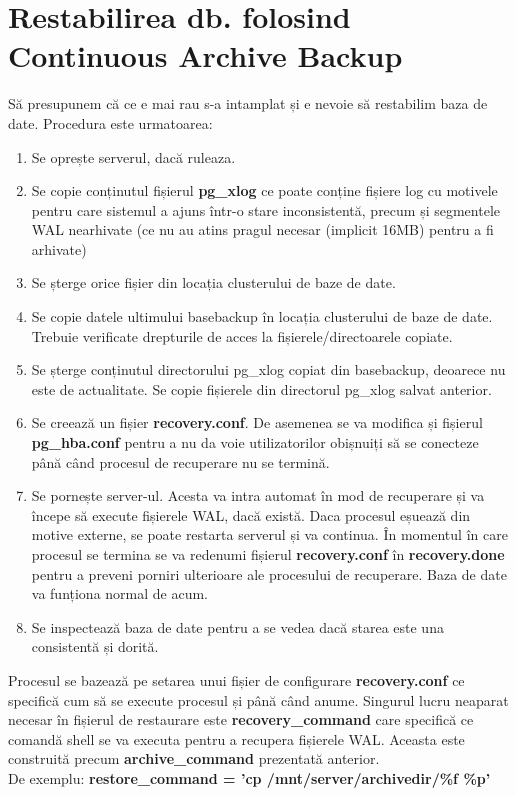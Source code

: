 \section{Restabilirea db. folosind Continuous Archive Backup}
Să presupunem că ce e mai rau s-a intamplat și e nevoie să restabilim baza de date. Procedura este urmatoarea:
\begin{enumerate}
\item
Se oprește serverul, dacă ruleaza.
\item
Se copie conținutul fișierul \textbf{pg_xlog} ce poate conține fișiere log cu motivele pentru care sistemul a ajuns într-o stare inconsistentă, precum și segmentele WAL nearhivate (ce nu au atins pragul necesar (implicit 16MB) pentru a fi arhivate)
\item
Se șterge orice fișier din locația clusterului de baze de date.
\item
Se copie datele ultimului basebackup în locația clusterului de baze de date. Trebuie verificate drepturile de acces la fișierele/directoarele copiate.
\item
Se șterge conținutul directorului pg_xlog copiat din basebackup, deoarece nu este de actualitate. Se copie fișierele din directorul pg_xlog salvat anterior.
\item
Se creează un fișier \textbf{recovery.conf}. De asemenea se va modifica și fișierul \textbf{pg_hba.conf} pentru a nu da voie utilizatorilor obișnuiți să se conecteze până când procesul de recuperare nu se termină.
\item
Se pornește server-ul. Acesta va intra automat în mod de recuperare și va începe să execute fișierele WAL, dacă există. Daca procesul eșuează din motive externe, se poate restarta serverul și va continua. În momentul în care procesul se termina se va redenumi fișierul \textbf{recovery.conf} în \textbf{recovery.done} pentru a preveni porniri ulterioare ale procesului de recuperare. Baza de date va funționa normal de acum.
\item 
Se inspectează baza de date pentru a se vedea dacă starea este una consistentă și dorită.
\end{enumerate}
Procesul se bazează pe setarea unui fișier de configurare \textbf{recovery.conf} ce specifică cum să se execute procesul și până când anume. Singurul lucru neaparat necesar în fișierul de restaurare este \textbf{recovery_command} care specifică ce comandă shell se va executa pentru a recupera fișierele WAL. Aceasta este construită precum \textbf{archive_command} prezentată anterior.\\
De exemplu: \textbf{restore_command = 'cp /mnt/server/archivedir/\%f \%p'}
